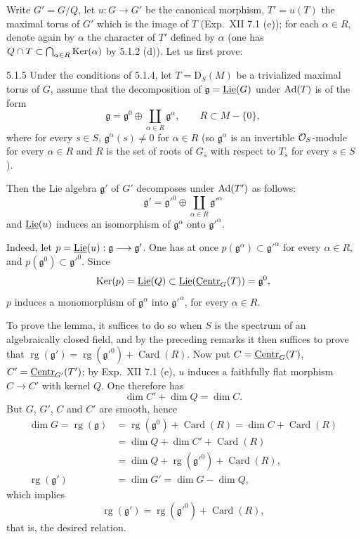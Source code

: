 Write $G'=G/Q$, let $u:G\to G'$ be the canonical morphism, $T'=u(T)$ the maximal torus of $G'$ which is the image of $T$ (\cf Exp.~XII 7.1 (e)); for each $\alpha\in R$, denote again by $\alpha$ the character of $T'$ defined by $\alpha$ (one has $Q\cap T\subset\bigcap_{\alpha\in R}\operatorname{Ker}(\alpha)$ by 5.1.2 (d)). Let us first prove:
\begin{lemma}{5.1.5}\label{XXII.5.1.5}
Under the conditions of 5.1.4, let $T=\mathrm D_S(M)$ be a trivialized maximal torus of $G$, assume that the decomposition of $\mathfrak g=\underline{\operatorname{Lie}}(G)$ under $\operatorname{Ad}(T)$ is of the form
\[
\mathfrak g=\mathfrak g^0\oplus\coprod_{\alpha\in R}\mathfrak g^\alpha,\qquad R\subset M-\{0\},
\]
where for every $s\in S$, $\mathfrak g^\alpha(s)\ne0$ for $\alpha\in R$ (so $\mathfrak g^\alpha$ is an invertible $\mathcal{O}_S$-module for every $\alpha\in R$ and $R$ is the set of roots of $G_{\overline s}$ with respect to $T_{\overline s}$ for every $s\in S$).

Then the Lie algebra $\mathfrak g'$ of $G'$ decomposes under $\operatorname{Ad}(T')$ as follows:
\[
\mathfrak g'=\mathfrak g'^0\oplus\coprod_{\alpha\in R}\mathfrak g'^\alpha
\]
and $\underline{\operatorname{Lie}}(u)$ induces an isomorphism of $\mathfrak g^\alpha$ onto $\mathfrak g'^\alpha$.
\end{lemma}
Indeed, let $p=\underline{\operatorname{Lie}}(u):\mathfrak g\longrightarrow\mathfrak g'$. One has at once $p(\mathfrak g^\alpha)\subset\mathfrak g'^\alpha$ for every $\alpha\in R$, and $p(\mathfrak g^0)\subset\mathfrak g'^0$. Since
\[
\operatorname{Ker}(p)=\underline{\operatorname{Lie}}(Q)\subset\underline{\operatorname{Lie}}(\underline{\mathrm{Centr}}_G(T))=\mathfrak g^0,
\]
$p$ induces a monomorphism of $\mathfrak g^\alpha$ into $\mathfrak g'^\alpha$, for every $\alpha\in R$.

To prove the lemma, it suffices to do so when $S$ is the spectrum of an algebraically closed field, and by the preceding remarks it then suffices to prove that $\operatorname{rg}(\mathfrak g')=\operatorname{rg}(\mathfrak g'^0)+\operatorname{Card}(R)$. Now put $C=\underline{\mathrm{Centr}}_G(T)$, $C'=\underline{\mathrm{Centr}}_{G'}(T')$; by Exp.~XII 7.1 (e), $u$ induces a faithfully flat morphism $C\to C'$ with kernel $Q$. One therefore has
\[
\dim C'+\dim Q=\dim C.
\]
But $G$, $G'$, $C$ and $C'$ are smooth, hence
\[
\begin{aligned}
\dim G=\operatorname{rg}(\mathfrak g)&=\operatorname{rg}(\mathfrak g^0)+\operatorname{Card}(R)=\dim C+\operatorname{Card}(R)\\
&=\dim Q+\dim C'+\operatorname{Card}(R)\\
&=\dim Q+\operatorname{rg}(\mathfrak g'^0)+\operatorname{Card}(R),\\
\operatorname{rg}(\mathfrak g')&=\dim G'=\dim G-\dim Q,
\end{aligned}
\]
which implies
\[
\operatorname{rg}(\mathfrak g')=\operatorname{rg}(\mathfrak g'^0)+\operatorname{Card}(R),
\]
that is, the desired relation.

